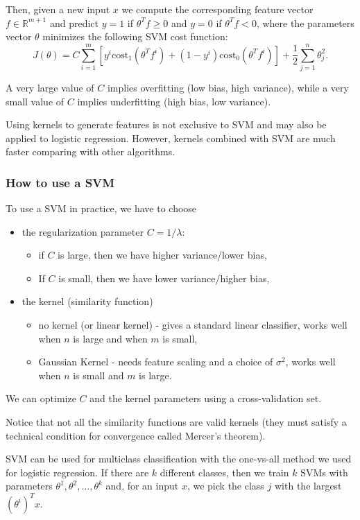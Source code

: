 \documentclass[a4paper,11pt]{report}
\begin{document}
Then, given a new input $x$ we compute the corresponding feature vector $f\in\mathbb{R}^{m+1}$ and predict $y=1$ if $\theta^Tf \ge 0$  and $y=0$ if $\theta^Tf < 0$, where the parameters vector $\theta$ minimizes the following SVM cost function:
$$ J(\theta) = C\sum_{i=1}^m \left[y^{i}\text{cost}_1(\theta^Tf^{i}) + (1 - y^{i})\text{cost}_0(\theta^Tf^{i})\right] + \dfrac{1}{2}\sum_{j=1}^n \theta^2_j.$$

A very large value of $C$ implies overfitting (low bias, high variance), while a very small value of $C$ implies underfitting (high bias, low variance).

Using kernels to generate features is not exclusive to SVM and may also be applied to logistic regression. However, kernels combined with SVM are much faster comparing with other algorithms.


\subsubsection*{How to use a SVM}

To use a SVM in practice, we have to choose
\begin{itemize}
\item the regularization parameter $C={1}/{\lambda}$:
\begin{itemize}
  \item if $C$ is large, then we have higher variance/lower bias,
  \item If $C$ is small, then we have lower variance/higher bias,
\end{itemize}
\item the kernel (similarity function)
\begin{itemize}
\item no kernel (or linear kernel) - gives a standard linear classifier, works well when $n$ is large and when $m$ is small,
\item Gaussian Kernel - needs feature scaling and a choice of $\sigma^2$, works well when $n$ is small and $m$ is large.
\end{itemize}
\end{itemize}

We can optimize $C$ and the kernel parameters using a cross-validation set.

Notice that not all the similarity functions are valid kernels (they must satisfy a technical condition for convergence called Mercer's theorem).

SVM can be used for multiclass classification with the one-vs-all method we used for logistic regression. If there are $k$ different classes, then we train $k$ SVMs with parameters $\theta^1, \theta^2, \ldots, \theta^k$ and, for an input $x$, we pick the class $j$ with the largest $(\theta^i)^Tx$.
\end{document}
